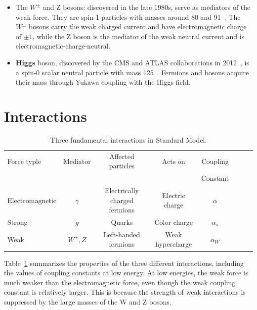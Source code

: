 \begin{itemize}
\begin{itemize}
  \item The $W^{\pm}$ and Z bosons: discovered in the late 1980s, serve as mediators of the weak force. They are spin-1 particles with masses around 80 and 91~\GeV. The \textbf{$W^{\pm}$} bosons carry the weak charged current and have electromagnetic charge of $\pm 1$, while the Z boson is the mediator of the weak neutral current and is electromagnetic-charge-neutral. 
    \item \textbf{Higgs} boson, discovered by the CMS and ATLAS collaborations in 2012~\cite{Aad:2012tfa,Chatrchyan:2012xdj}, is a spin-0 scalar neutral particle with mass 125~\GeV. Fermions and bosons acquire their mass through Yukawa coupling with the Higgs field. 
\end{itemize}
\end{itemize}
 
 

\section{Interactions}
\begin{table}[tbh]
\centering
\tiny
\begin{tabular}{|l|c|c|c|c|c|c|c}

\hline
    Force typle & Mediator & Affected particles & Acts on & Coupling\\
    &&&&Constant\\ 
    \hline
\hline
    Electromagnetic & $\gamma$&Electrically charged fermions&Electric charge& $\alpha$ \\
    Strong  & $g$ &Quarks & Color charge& $\alpha_s$ \\
    Weak & $W^{\pm}, Z$ &Left-handed fermions & Weak hypercharge& $\alpha_W$ \\
\hline
\end{tabular}
\caption{Three fundamental interactions in Standard Model. }
\label{tab:forces}
\end{table}

\par Table~\ref{tab:forces} summarizes the properties of the three different interactions, including the values of coupling constants at low energy. 
At low energies, the weak force is much weaker than the electromagnetic force, even though the weak coupling constant is relatively larger. 
This is because the strength of weak interactions is suppressed by the large masses of the W and Z bosons. 

